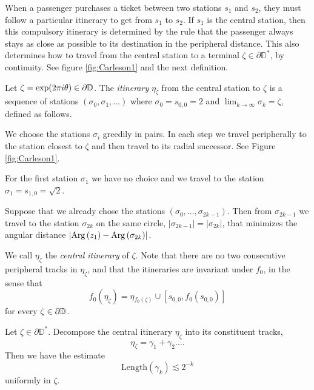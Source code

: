 When a passenger purchases a ticket between two stations $s_1$ and $s_2$, they must follow a particular itinerary to get from $s_1$ to $s_2$.
If $s_1$ is the central station, then this compulsory itinerary is determined by the rule that the passenger always stays as close as possible to its destination in the peripheral distance. 
This also determines how to travel from the central station to a terminal $\zeta\in \partial \mathbb D^*$, by continuity. See figure \ref{fig:Carleson1} and the next definition.


\begin{definition}
Let $\zeta=\exp(2\pi i\theta)\in\partial\mathbb{D}$. The \emph{itinerary} $\eta_\zeta$ from the central station to $\zeta$ is a sequence of stations $\left(\sigma_{0},\sigma_{1},\ldots\right)$ where $\sigma_{0}=s_{0,0}=2$ and $\lim_{k\to \infty} \sigma_{k}=\zeta$, defined as follows.

We choose the stations $\sigma_{i}$ greedily in pairs. In each step
we travel peripherally to the station closest to $\zeta$ and then
travel to its radial successor. See Figure \ref{fig:Carleson1}. 

For the first station $\sigma_{1}$ we have no choice and we travel
to the station $\sigma_{1}=s_{1,0}=\sqrt{2}$.

Suppose that we already chose the stations $\left(\sigma_{0},\ldots,\sigma_{2k-1}\right)$.
Then from $\sigma_{2k-1}$ we travel to the station $\sigma_{2k}$
on the same circle, $\left|\sigma_{2k-1}\right|=\left|\sigma_{2k}\right|$,
that minimizes the angular distance $\left|\mathrm{Arg}\left(z_{1}\right)-\mathrm{Arg}\left(\sigma_{2k}\right)\right|$. 

\end{definition} 

We call $\eta_{\zeta}$ the \emph{central itinerary} of $\zeta$.
Note that there are no two consecutive peripheral tracks in $\eta_{\zeta}$, and that the itineraries are invariant under $f_{0}$, in the sense that $$f_{0}(\eta_{\zeta})=\eta{}_{f_{0}(\zeta)}\cup[s_{0,0},f_0(s_{0,0})]$$
for every $\zeta\in\partial\mathbb{D}$.

\begin{lemma}
Let $\zeta\in \partial \mathbb D^*$. Decompose the central itinerary $\eta_{\zeta}$ into its constituent tracks, 
$$\eta_{\zeta}=\gamma _1 + \gamma_2\ldots .$$ 
	Then we have the estimate $$\mathrm{Length}(\gamma_{k})\lesssim2^{-k}$$ uniformly in $\zeta$. 

\end{lemma}


